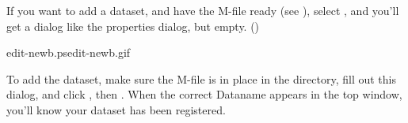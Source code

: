 If you want to add a dataset, and have the M-file ready (see
), select , and you'll get
a dialog like the properties dialog, but empty.
() 

%
{edit-newb.ps}{edit-newb.gif}{}

To add the dataset, make sure the M-file is in place in the
 directory, fill out this dialog, and click ,
then .  When the correct Dataname appears in the top
window, you'll know your dataset has been registered.


%
%
%
%
%
%
%
%
%
%
%

